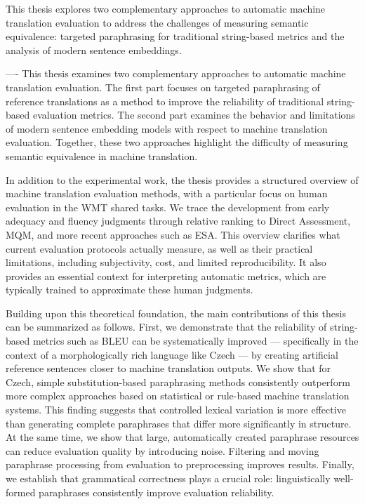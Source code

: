 \documentclass[12pt,a4paper]{report}
\newcommand{\bleu}{\textsc{BLEU}\xspace}
\begin{document}
This thesis explores two complementary approaches to automatic machine translation 
evaluation to address the challenges of measuring semantic equivalence: targeted 
paraphrasing for traditional string-based metrics and the analysis of modern sentence 
embeddings. 

----
This thesis examines two complementary approaches to automatic machine translation evaluation. The first part focuses on targeted paraphrasing of reference translations as a method to improve the reliability of traditional string-based evaluation metrics. The second part examines the behavior and limitations of modern sentence embedding models with respect to machine translation evaluation. Together, these two approaches highlight the difficulty of measuring semantic equivalence in machine translation.

In addition to the experimental work, the thesis provides a structured overview of machine translation evaluation methods, with a particular focus on human evaluation in the WMT shared tasks. We trace the development from early adequacy and fluency judgments through relative ranking to Direct Assessment, MQM, and more recent approaches such as ESA. This overview clarifies what current evaluation protocols actually measure, as well as their practical limitations, including subjectivity, cost, and limited reproducibility. It also provides an essential context for interpreting automatic metrics, which are typically trained to approximate these human judgments.

Building upon this theoretical foundation, the main contributions of this thesis can be summarized as follows. First, we demonstrate that the reliability of string-based metrics such as \bleu can be systematically improved --- specifically in the context of a morphologically rich language like Czech --- by creating artificial reference sentences closer to machine translation outputs. We show that for Czech, simple substitution-based paraphrasing methods consistently outperform more complex approaches based on statistical or rule-based machine translation systems. This finding suggests that controlled lexical variation is more effective than generating complete paraphrases that differ more significantly in structure. At the same time, we show that large, automatically created paraphrase resources can reduce evaluation quality by introducing noise. Filtering and moving paraphrase processing from evaluation to preprocessing improves results. Finally, we establish that grammatical correctness plays a crucial role: linguistically well-formed paraphrases consistently improve evaluation reliability.
\end{document}
